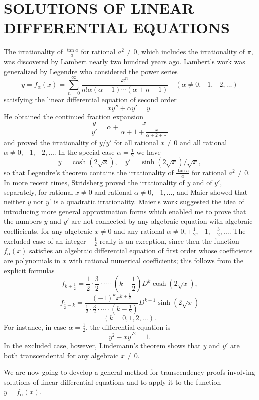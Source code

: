 \chapter{SOLUTIONS OF LINEAR DIFFERENTIAL EQUATIONS}

The irrationality of $\frac{\tan a}{a}$ for rational $a^2 \neq 0$, which includes the irrationality of $\pi$, was discovered by Lambert nearly two hundred years ago. Lambert's work was generalized by Legendre who considered the power series
\[
y = f_{\alpha}(x) = \sum_{n=0}^{\infty} \frac{x^n}{n! \alpha(\alpha+1) \cdots (\alpha+n-1)} \quad (\alpha \neq 0, -1, -2, \ldots)
\]
satisfying the linear differential equation of second order
\[xy'' + \alpha y' = y.\]
He obtained the continued fraction expansion
\[\frac{y}{y'} = \alpha + \frac{x}{\alpha + 1 + \frac{x}{\alpha + 2 + \cdots}}\]
and proved the irrationality of $y/y'$ for all rational $x \neq 0$ and all rational $\alpha \neq 0, -1, -2, \ldots.$ In the special case $\alpha = \frac{1}{2}$ we have
\[y = \cosh (2\sqrt{x}), \quad y' = \sinh (2\sqrt{x})/\sqrt{x},\]
so that Legendre's theorem contains the irrationality of $\frac{\tan a}{a}$ for rational $a^2 \neq 0$. In more recent times, Stridsberg proved the irrationality of $y$ and of $y'$, separately, for rational $x \neq 0$ and rational $\alpha \neq 0, -1, \ldots$, and Maier showed that neither $y$ nor $y'$ is a quadratic irrationality. Maier's work suggested the idea of introducing more general approximation forms which enabled me to prove that the numbers $y$ and $y'$ are not connected by any algebraic equation with algebraic coefficients, for any algebraic $x \neq 0$ and any rational $\alpha \neq 0, \pm \frac{1}{2}, -1, \pm \frac{3}{2}, \ldots.$ The excluded case of an integer $+ \frac{1}{2}$ really is an exception, since then the function $f_{\alpha}(x)$ satisfies an algebraic differential equation of first order whose coefficients are polynomials in $x$ with rational numerical coefficients; this follows from the explicit formulas
\[f_{k+\frac{1}{2}} = \frac{1}{2} \cdot \frac{3}{2} \cdot \cdots \cdot \left(k - \frac{1}{2}\right) D^{k} \cosh (2\sqrt{x}),\]
\[f_{\frac{1}{2}-k} = \frac{(-1)^{k} x^{k+\frac{1}{2}}}{\frac{1}{2} \cdot \frac{3}{2} \cdot \cdots \cdot \left(k - \frac{1}{2}\right)} D^{k+1} \sinh (2\sqrt{x})\]
\[(k=0,1,2,\ldots).\]
For instance, in case $\alpha = \frac{1}{2}$, the differential equation is
\[y^2 - xy'^2 = 1.\]
In the excluded case, however, Lindemann's theorem shows that $y$ and $y'$ are both transcendental for any algebraic $x \neq 0$.

We are now going to develop a general method for transcendency proofs involving solutions of linear differential equations and to apply it to the function $y=f_{\alpha}(x)$.

